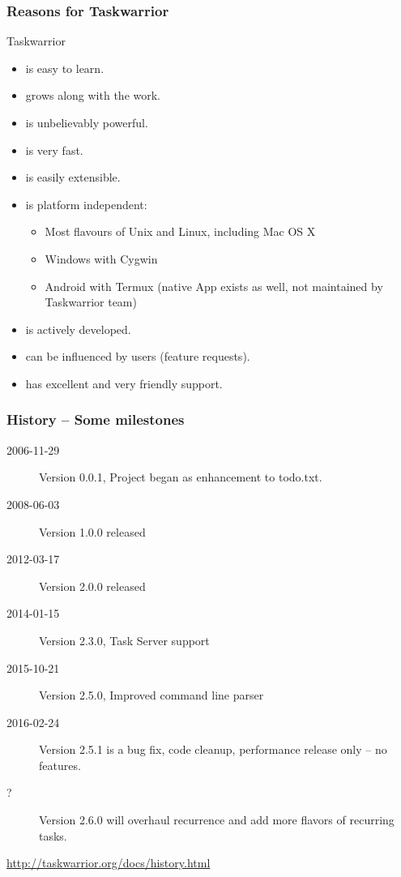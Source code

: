 \documentclass[t,handout]{beamer}
\begin{document}
\begin{frame}[fragile]\frametitle{Reasons for Taskwarrior}
Taskwarrior
\begin{itemize}
	\item is easy to learn.
	\item grows along with the work.
	\item is unbelievably powerful.
	\item is very fast.
	\item is easily extensible.
	\item is platform independent:
	\begin{itemize}
		\item Most flavours of Unix and Linux, including Mac OS X
		\item Windows with Cygwin
		\item Android with Termux (native App exists as well, not maintained by Taskwarrior team)
	\end{itemize}
	\item is actively developed.
	\item can be influenced by users (feature requests).
	\item has excellent and very friendly support.
\end{itemize}
\end{frame}

\begin{frame}[fragile]\frametitle{History -- Some milestones}
    \begin{description}
        \item[2006-11-29] Version 0.0.1, Project began as enhancement to todo.txt.
        \item[2008-06-03] Version 1.0.0 released
        \item[2012-03-17] Version 2.0.0 released
        \item[2014-01-15] Version 2.3.0, Task Server support
        \item[2015-10-21] Version 2.5.0, Improved command line parser
        \item[2016-02-24] Version 2.5.1 is a bug fix, code cleanup, performance release only -- no features.
        \item[?]          Version 2.6.0 will overhaul recurrence and add more flavors of recurring tasks.
    \end{description}

    \url{http://taskwarrior.org/docs/history.html}
\end{frame}
\end{document}
